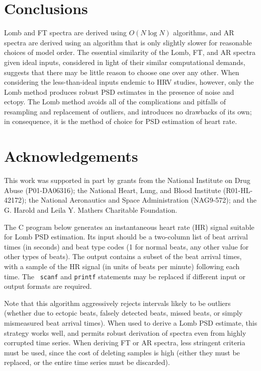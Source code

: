 \documentclass[twocolumn]{cinc}
\begin{document}
\section{Conclusions}

Lomb and FT spectra are derived using $O(N \log N)$ algorithms,
and AR spectra are derived using an algorithm that is only slightly
slower for reasonable choices of model order.  The essential
similarity of the Lomb, FT, and AR spectra given ideal inputs,
considered in light of their similar computational demands, suggests
that there may be little reason to choose one over any other.
When considering the less-than-ideal inputs endemic to HRV studies,
however, only the Lomb method produces robust PSD estimates in the
presence of noise and ectopy.  The Lomb method avoids all of the
complications and pitfalls of resampling and replacement of outliers,
and introduces no drawbacks of its own; in consequence, it is the
method of choice for PSD estimation of heart rate.

\section*{Acknowledgements}

This work was supported in part by grants from the National Institute
on Drug Abuse (P01-DA06316); the National Heart, Lung, and Blood
Institute (R01-HL-42172); the National Aeronautics and Space
Administration (NAG9-572); and the G. Harold and Leila Y. Mathers
Charitable Foundation.



\vspace*{4mm}
\appendix{}

The C program below generates an instantaneous heart rate (HR) signal
suitable for Lomb PSD estimation.  Its input should be a two-column
list of beat arrival times (in seconds) and beat type codes (1 for
normal beats, any other value for other types of beats).  The output
contains a subset of the beat arrival times, with a sample of the HR
signal (in units of beats per minute) following each time.  The {\tt
scanf} and {\tt printf} statements may be replaced if different input
or output formats are required.
\balance

Note that this algorithm aggressively rejects intervals likely to be
outliers (whether due to ectopic beats, falsely detected beats,
missed beats, or simply mismeasured beat arrival times).  When used to
derive a Lomb PSD estimate, this strategy works well, and permits
robust derivation of spectra even from highly corrupted time series.
When deriving FT or AR spectra, less stringent criteria must be used,
since the cost of deleting samples is high (either they must be
replaced, or the entire time series must be discarded).
\end{document}
